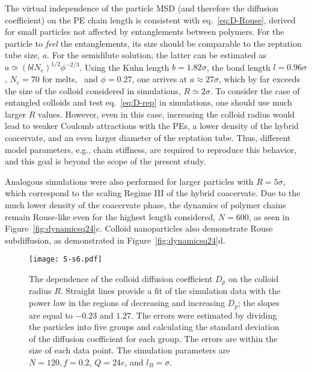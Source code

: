 \documentclass[journal=mamobx, manuscript=article]{achemso}
\begin{document}
The virtual independence of the particle MSD (and therefore the diffusion coefficient) on the PE chain length is consistent with eq.~\ref{eq:D-Rouse}, derived for small particles not affected by entanglements between polymers. For the particle to \textit{feel} the entanglements, its size should be comparable to the reptation tube size, $a$. For the semidilute solution, the latter can be estimated as $a \simeq \left( b l N_{e} \right)^{1/2}\phi^{-2/3}$. Using the Kuhn length $b = 1.82\sigma$, the bond length $l = 0.96\sigma$, $N_{e} = 70$ for melts,~\cite{everaers2004rheology} and $\phi = 0.27$, one arrives at $a \approx 27 \sigma$, which by far exceeds the size of the colloid considered in simulations, $R \simeq 2 \sigma$. To consider the case of entangled colloids and test eq.~\ref{eq:D-rep} in simulations, one should use much larger $R$ values. However, even in this case, increasing the colloid radius would lead to weaker Coulomb attractions with the PEs, a lower density of the hybrid coacervate, and an even larger diameter of the reptation tube. Thus, different model parameters, e.g., chain stiffness, are required to reproduce this behavior, and this goal is beyond the scope of the present study.

Analogous simulations were also performed for larger particles with $R = 5\sigma$, which correspond to the scaling Regime III of the hybrid coacervate. Due to the much lower density of the coacervate phase, the dynamics of polymer chains remain Rouse-like even for the highest length considered, $N = 600$, as seen in Figure~\ref{fig:dynamicsq24}c. Colloid nanoparticles also demonstrate Rouse subdiffusion, as demonstrated in Figure~\ref{fig:dynamicsq24}d. 

\begin{figure}[ht]
\centering
\texttt{[image: 5-s6.pdf]}
\caption{The dependence of the colloid diffusion coefficient $D_{p}$ on the colloid radius $R$. Straight lines provide a  fit of the simulation data with the power law in the regions of decreasing and increasing $D_{p}$; the slopes are equal to $-0.23$ and $1.27$. The errors were estimated by dividing the particles into five groups and calculating the standard deviation of the diffusion coefficient for each group. The errors are within the size of each data point. The simulation parameters are $N = 120, f = 0.2$, $Q = 24e$, and $l_{B} = \sigma$.}
\label{fig:D_vs_R}
\end{figure}
\end{document}
